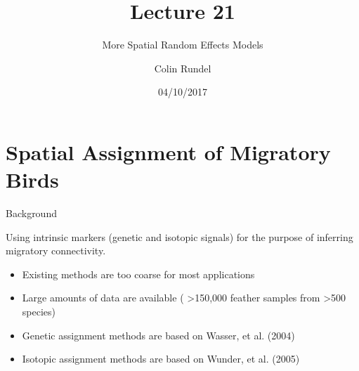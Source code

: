 \documentclass[11pt,ignorenonframetext,]{beamer}
\title{Lecture 21}
\subtitle{More Spatial Random Effects Models}
\author{Colin Rundel}
\date{04/10/2017}
\providecommand{\tightlist}{%
  \setlength{\itemsep}{0pt}\setlength{\parskip}{0pt}}
\begin{document}
\frame{\titlepage}

\section{Spatial Assignment of Migratory
Birds}\label{spatial-assignment-of-migratory-birds}

\begin{frame}{Background}

Using intrinsic markers (genetic and isotopic signals) for the purpose
of inferring migratory connectivity.

\vspace{2mm}

\begin{itemize}
\tightlist
\item
  Existing methods are too coarse for most applications
\end{itemize}

\vspace{2mm}

\begin{itemize}
\tightlist
\item
  Large amounts of data are available ( \textgreater{}150,000 feather
  samples from \textgreater{}500 species)
\end{itemize}

\vspace{2mm}

\begin{itemize}
\tightlist
\item
  Genetic assignment methods are based on Wasser, et al. (2004)
\end{itemize}

\vspace{2mm}

\begin{itemize}
\tightlist
\item
  Isotopic assignment methods are based on Wunder, et al. (2005)
\end{itemize}

\end{frame}
\end{document}

